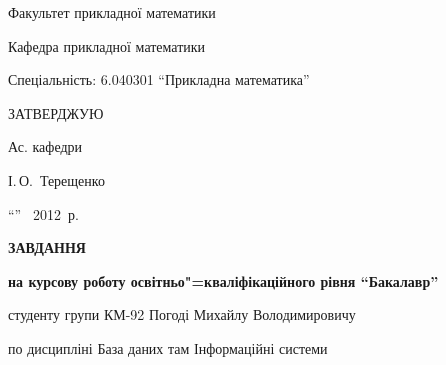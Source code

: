 \documentclass[a4paper,notitlepage,headsepline,pdftex,oneside]{report}
\newcommand{\setfontsize}[1]{\fontsize{#1pt}{#1pt}\selectfont}
\begin{document}
\vspace{1cm}

\setfontsize{14pt}
\renewcommand{\baselinestretch}{1.5}


Факультет прикладної математики

Кафедра прикладної математики

Спеціальність: 6.040301 ``Прикладна математика''

\vspace{1cm}

\hfill\begin{minipage}{0.5\textwidth}
  ЗАТВЕРДЖУЮ

  Ас. кафедри

  \underline{\hspace{8em}} І.\,О.~Терещенко

  ``\underline{\hspace{2em}}''~\underline{\hspace{9em}} 2012~р.
\end{minipage}

\vspace{1cm}

\begin{center}
  \textbf{ЗАВДАННЯ}

  \textbf{на курсову роботу освітньо"=кваліфікаційного рівня ``Бакалавр''}

  студенту групи КМ-92 Погоді Михайлу Володимировичу

  по дисципліні База даних там Інформаційні системи
\end{center}

\vspace{1cm}
\end{document}
